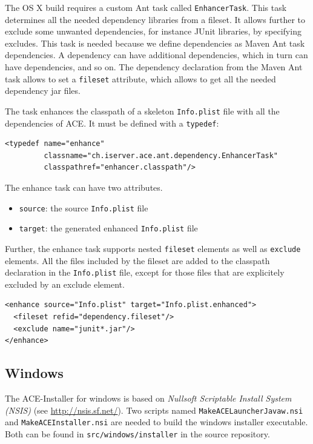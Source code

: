 \documentclass[11pt,a4paper]{article}
\begin{document}
The OS X build requires a custom Ant task called \texttt{EnhancerTask}. 
This task determines all the needed
dependency libraries from a fileset. It allows further to exclude some
unwanted dependencies, for instance JUnit libraries, by specifying excludes.
This task is needed because we define dependencies as Maven Ant task
dependencies. A dependency can have additional dependencies, which in turn
can have dependencies, and so on. The dependency declaration from 
the Maven Ant task allows to set a \texttt{fileset} attribute, which allows to
get all the needed dependency jar files.

The task enhances the classpath of a skeleton \texttt{Info.plist} file with all
the dependencies of ACE. It must be defined with a \texttt{typedef}:
\small{
\begin{verbatim}
<typedef name="enhance"
         classname="ch.iserver.ace.ant.dependency.EnhancerTask"
         classpathref="enhancer.classpath"/>
\end{verbatim}
}

The enhance task can have two attributes.
\begin{itemize}
 \item \texttt{source}: the source \texttt{Info.plist} file
 \item \texttt{target}: the generated enhanced \texttt{Info.plist} file
\end{itemize}

Further, the enhance task supports nested \texttt{fileset} elements as well
as \texttt{exclude} elements. All the files included by the fileset are
added to the classpath declaration in the \texttt{Info.plist} file, except
for those files that are explicitely excluded by an exclude element.

\small{
\begin{verbatim}
<enhance source="Info.plist" target="Info.plist.enhanced">
  <fileset refid="dependency.fileset"/>
  <exclude name="junit*.jar"/>
</enhance>
\end{verbatim}
}


\subsection{Windows}
The ACE-Installer for windows is based on \textit{Nullsoft Scriptable Install System (NSIS)} (see \href{http://nsis.sf.net/}{http://nsis.sf.net/}). Two scripts named \texttt{MakeACELauncherJavaw.nsi} and \texttt{MakeACEInstaller.nsi} are needed to build the windows installer executable. Both can be found in \texttt{src/windows/installer} in the source repository.
\end{document}
